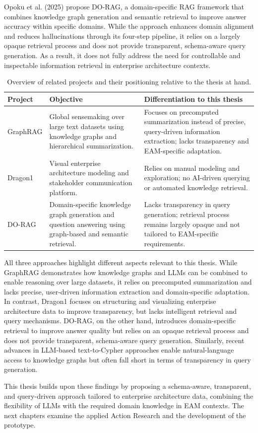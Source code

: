Opoku et al. (2025) \cite{opoku2025rag} propose DO-RAG, a domain-specific RAG framework that combines knowledge graph generation and semantic retrieval to improve answer accuracy within specific domains. While the approach enhances domain alignment and reduces hallucinations through its four-step pipeline, it relies on a largely opaque retrieval process and does not provide transparent, schema-aware query generation. As a result, it does not fully address the need for controllable and inspectable information retrieval in enterprise architecture contexts.

\begin{table}[h]
\centering
\caption{Overview of related projects and their positioning relative to the thesis at hand.}
\label{tab:related_projects}
\begin{tabularx}{\textwidth}{p{2.5cm} X X}
\toprule
\textbf{Project} & \textbf{Objective} & \textbf{Differentiation to this thesis} \\
\midrule
GraphRAG & Global sensemaking over large text datasets using knowledge graphs and hierarchical summarization. & Focuses on precomputed summarization instead of precise, query-driven information extraction; lacks transparency and EAM-specific adaptation. \\
Dragon1 & Visual enterprise architecture modeling and stakeholder communication platform. & Relies on manual modeling and exploration; no AI-driven querying or automated knowledge retrieval. \\
DO-RAG & Domain-specific knowledge graph generation and question answering using graph-based and semantic retrieval. & Lacks transparency in query generation; retrieval process remains largely opaque and not tailored to EAM-specific requirements. \\
\bottomrule
\end{tabularx}
\end{table}

All three approaches highlight different aspects relevant to this thesis. While GraphRAG demonstrates how knowledge graphs and LLMs can be combined to enable reasoning over large datasets, it relies on precomputed summarization and lacks precise, user-driven information extraction and domain-specific adaptation. In contrast, Dragon1 focuses on structuring and visualizing enterprise architecture data to improve transparency, but lacks intelligent retrieval and query mechanisms. DO-RAG, on the other hand, introduces domain-specific retrieval to improve answer quality but relies on an opaque retrieval process and does not provide transparent, schema-aware query generation. Similarly, recent advances in LLM-based text-to-Cypher approaches enable natural-language access to knowledge graphs but often fall short in terms of transparency in query generation.

This thesis builds upon these findings by proposing a schema-aware, transparent, and query-driven approach tailored to enterprise architecture data, combining the flexibility of LLMs with the required domain knowledge in EAM contexts. The next chapters examine the applied Action Research and the development of the prototype.
